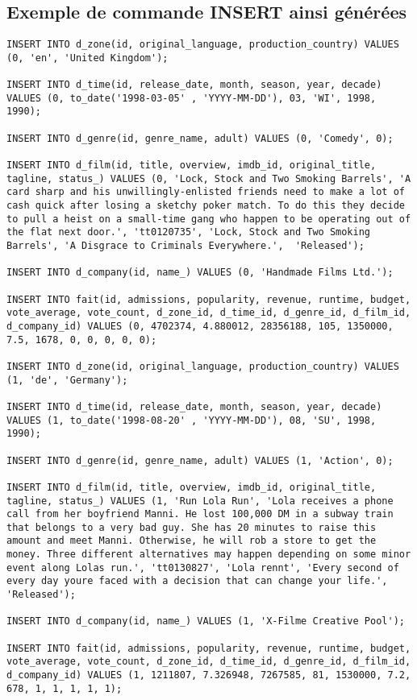 \subsection{Exemple de commande INSERT ainsi générées}

\begin{lstlisting}
INSERT INTO d_zone(id, original_language, production_country) VALUES (0, 'en', 'United Kingdom');

INSERT INTO d_time(id, release_date, month, season, year, decade) VALUES (0, to_date('1998-03-05' , 'YYYY-MM-DD'), 03, 'WI', 1998, 1990);

INSERT INTO d_genre(id, genre_name, adult) VALUES (0, 'Comedy', 0);

INSERT INTO d_film(id, title, overview, imdb_id, original_title, tagline, status_) VALUES (0, 'Lock, Stock and Two Smoking Barrels', 'A card sharp and his unwillingly-enlisted friends need to make a lot of cash quick after losing a sketchy poker match. To do this they decide to pull a heist on a small-time gang who happen to be operating out of the flat next door.', 'tt0120735', 'Lock, Stock and Two Smoking Barrels', 'A Disgrace to Criminals Everywhere.',  'Released');

INSERT INTO d_company(id, name_) VALUES (0, 'Handmade Films Ltd.');

INSERT INTO fait(id, admissions, popularity, revenue, runtime, budget, vote_average, vote_count, d_zone_id, d_time_id, d_genre_id, d_film_id, d_company_id) VALUES (0, 4702374, 4.880012, 28356188, 105, 1350000, 7.5, 1678, 0, 0, 0, 0, 0);

INSERT INTO d_zone(id, original_language, production_country) VALUES (1, 'de', 'Germany');

INSERT INTO d_time(id, release_date, month, season, year, decade) VALUES (1, to_date('1998-08-20' , 'YYYY-MM-DD'), 08, 'SU', 1998, 1990);

INSERT INTO d_genre(id, genre_name, adult) VALUES (1, 'Action', 0);

INSERT INTO d_film(id, title, overview, imdb_id, original_title, tagline, status_) VALUES (1, 'Run Lola Run', 'Lola receives a phone call from her boyfriend Manni. He lost 100,000 DM in a subway train that belongs to a very bad guy. She has 20 minutes to raise this amount and meet Manni. Otherwise, he will rob a store to get the money. Three different alternatives may happen depending on some minor event along Lolas run.', 'tt0130827', 'Lola rennt', 'Every second of every day youre faced with a decision that can change your life.',  'Released');

INSERT INTO d_company(id, name_) VALUES (1, 'X-Filme Creative Pool');

INSERT INTO fait(id, admissions, popularity, revenue, runtime, budget, vote_average, vote_count, d_zone_id, d_time_id, d_genre_id, d_film_id, d_company_id) VALUES (1, 1211807, 7.326948, 7267585, 81, 1530000, 7.2, 678, 1, 1, 1, 1, 1);

\end{lstlisting}

